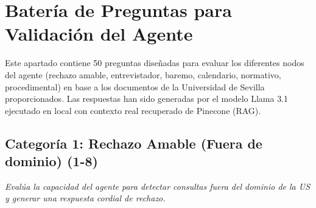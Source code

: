 \documentclass{article}
\begin{document}
\newpage
\section{Batería de Preguntas para Validación del Agente}

Este apartado contiene 50 preguntas diseñadas para evaluar los diferentes nodos del agente (rechazo amable, entrevistador, baremo, calendario, normativo, procedimental) en base a los documentos de la Universidad de Sevilla proporcionados. Las respuestas han sido generadas por el modelo Llama 3.1 ejecutado en local con contexto real recuperado de Pinecone (RAG).

\subsection{Categoría 1: Rechazo Amable (Fuera de dominio) (1-8)}
\textit{Evalúa la capacidad del agente para detectar consultas fuera del dominio de la US y generar una respuesta cordial de rechazo.}
\end{document}
